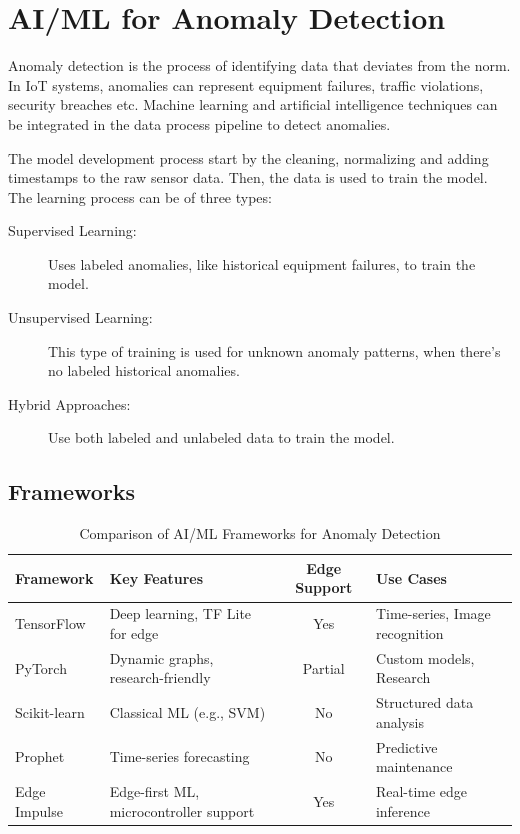 \section{AI/ML for Anomaly Detection}
Anomaly detection is the process of identifying data that deviates from the norm.
In IoT systems, anomalies can represent equipment failures, traffic violations,
security breaches etc. Machine learning and artificial intelligence techniques
can be integrated in the data process pipeline to detect anomalies.

The model development process start by the cleaning, normalizing and adding
timestamps to the raw sensor data. Then, the data is used to train the model.
The learning process can be of three types:

\begin{description}
	\item[Supervised Learning: ] Uses labeled anomalies, like historical equipment
	      failures, to train the model.


	\item[Unsupervised Learning: ] This type of training is used for unknown
	      anomaly patterns, when there's no labeled historical anomalies.


	\item[Hybrid Approaches: ] Use both labeled and unlabeled data to train the
	      model.
\end{description}

\subsection{Frameworks}
\begin{table}[ht]
	\centering
	\caption{Comparison of AI/ML Frameworks for Anomaly Detection}
	\label{tab:ai-ml:frameworks}
	\begin{tabular}{p{2cm}p{4cm}cp{3cm}}
		\toprule
		\textbf{Framework} & \textbf{Key Features}                  & \textbf{Edge Support} & \textbf{Use Cases}             \\
		\midrule
		TensorFlow         & Deep learning, TF Lite for edge        & Yes                   & Time-series, Image recognition \\
		PyTorch            & Dynamic graphs, research-friendly      & Partial               & Custom models, Research        \\
		Scikit-learn       & Classical ML (e.g., SVM)               & No                    & Structured data analysis       \\
		Prophet            & Time-series forecasting                & No                    & Predictive maintenance         \\
		Edge Impulse       & Edge-first ML, microcontroller support & Yes                   & Real-time edge inference       \\
		\bottomrule
	\end{tabular}
\end{table}

